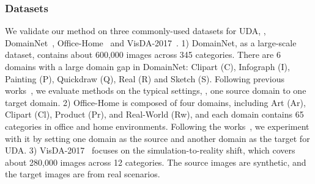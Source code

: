 \documentclass[journal]{IEEEtran}
\begin{document}
\subsubsection{Datasets}
We validate our method on three commonly-used datasets for UDA, \ieno, DomainNet~\cite{peng2019momentDomainNet}, Office-Home~\cite{venkateswara2017deepOffice-Home} and VisDA-2017~\cite{peng2017visdaViSDA2017}. 1) DomainNet, as a large-scale dataset, contains about 600,000 images across 345 categories. There are 6 domains with a large domain gap in DomainNet: Clipart (C), Infograph (I), Painting (P), Quickdraw (Q), Real (R) and Sketch (S). 
Following previous works~\cite{sun2022safeSSRT,xu2021cdtransCDTrans}, 
we evaluate methods on the typical settings, \ieno, one source domain to one target domain. 
2) Office-Home is composed of four domains, including Art (Ar), Clipart (Cl), Product (Pr), and Real-World (Rw), and each domain contains 65 categories in office and home environments. Following the works~\cite{sun2022safeSSRT,wei2021toalign,xu2021cdtransCDTrans}, we experiment with it by setting one domain as the source and another domain as the target for UDA. 3) VisDA-2017~\cite{peng2017visdaViSDA2017} focuses on the simulation-to-reality shift, which covers about 280,000 images across 12 categories. The source images are synthetic, and the target images are from real scenarios.
\end{document}
